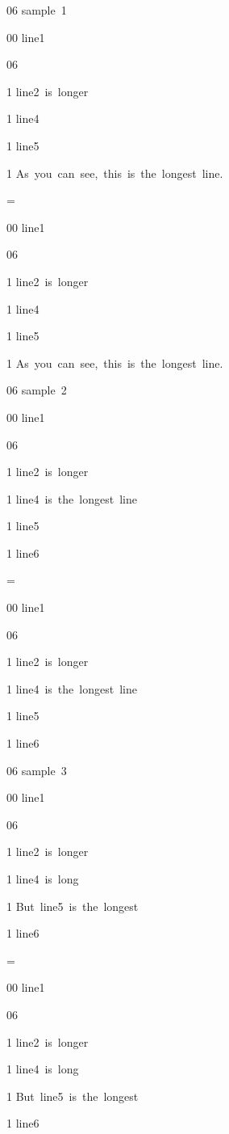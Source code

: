 \documentclass{article}
\def\a{
\begin{VBOX}{0}{0}
line1

\begin{VBOX}{0}{6}
\begin{HBOX}{1}%
line2~is~longer%
\end{HBOX}%

\begin{HBOX}{1}%
line4%
\end{HBOX}%
\end{VBOX}

\begin{HBOX}{1}%
line5%
\end{HBOX}%

\begin{HBOX}{1}%
As~you~can~see,~this~is~the~longest~line.%
\end{HBOX}%
\end{VBOX}
}
\def\b{
\begin{VBOX}{0}{0}
line1

\begin{VBOX}{0}{6}
\begin{HBOX}{1}%
line2~is~longer%
\end{HBOX}%

\begin{HBOX}{1}%
line4~is~the~longest~line%
\end{HBOX}%
\end{VBOX}

\begin{HBOX}{1}%
line5%
\end{HBOX}%

\begin{HBOX}{1}%
line6%
\end{HBOX}%
\end{VBOX}
}
\def\c{%
\begin{VBOX}{0}{0}
line1

\begin{VBOX}{0}{6}
\begin{HBOX}{1}%
line2~is~longer%
\end{HBOX}%

\begin{HBOX}{1}%
line4~is~long%
\end{HBOX}%
\end{VBOX}

\begin{HBOX}{1}%
But~line5~is~the~longest%
\end{HBOX}%


\begin{HBOX}{1}%
line6%
\end{HBOX}%
\end{VBOX}
}
\begin{document}
\begin{boxenv}
\begin{VBOX}{0}{6}
sample~1

\a

\begin{LBOX}{=}%
\a%
\end{LBOX}%
\end{VBOX}
\end{boxenv}

\vskip1cm

\begin{boxenv}
\begin{VBOX}{0}{6}
sample~2

\b

\begin{LBOX}{=}%
\b%
\end{LBOX}%
\end{VBOX}
\end{boxenv}

\vskip1cm

\begin{boxenv}
\begin{VBOX}{0}{6}
sample~3

\c

\begin{LBOX}{=}%
\c%
\end{LBOX}%
\end{VBOX}
\end{boxenv}
\end{document}
